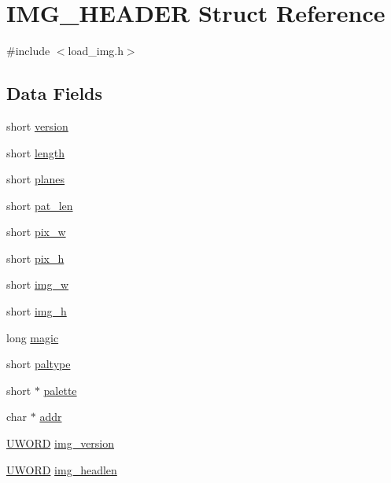 \hypertarget{structIMG__HEADER}{\section{I\+M\+G\+\_\+\+H\+E\+A\+D\+E\+R Struct Reference}
\label{structIMG__HEADER}
}


{\ttfamily \#include $<$load\+\_\+img.\+h$>$}

\subsection*{Data Fields}
\begin{DoxyCompactItemize}
\item 
short \hyperlink{structIMG__HEADER_a1b1d98bc34d00dcc045621d7d108aa33}{version}
\item 
short \hyperlink{structIMG__HEADER_a9b880fd83909bcba7f3e849b57a9a0c0}{length}
\item 
short \hyperlink{structIMG__HEADER_ad4657aaf83e1c3a89230a56177bdc7f4}{planes}
\item 
short \hyperlink{structIMG__HEADER_a93e811df0ab124abb41aca253725e620}{pat\+\_\+len}
\item 
short \hyperlink{structIMG__HEADER_a7f36b605eb7f7ff7f7157fba53a00e0b}{pix\+\_\+w}
\item 
short \hyperlink{structIMG__HEADER_a402dd152d2d3c8e41a69708a2d2eec7b}{pix\+\_\+h}
\item 
short \hyperlink{structIMG__HEADER_acab9fca679b5827910e3c2a6e302e9f2}{img\+\_\+w}
\item 
short \hyperlink{structIMG__HEADER_aeae05d69855fcda61b9d2e9f5e7aec32}{img\+\_\+h}
\item 
long \hyperlink{structIMG__HEADER_abbbc6e8856fd81c6feef3add32208f3f}{magic}
\item 
short \hyperlink{structIMG__HEADER_a7670a47b02ace635063baec09703a7ed}{paltype}
\item 
short $\ast$ \hyperlink{structIMG__HEADER_a62627863acc4854672b716af0f69a4b9}{palette}
\item 
char $\ast$ \hyperlink{structIMG__HEADER_a02e180ad82eed90e0aee536a3cfe62ac}{addr}
\item 
\hyperlink{bitmfile_8h_a0428171499a4ab7aebc2bf058ae337df}{U\+W\+O\+R\+D} \hyperlink{structIMG__HEADER_a419b9ebcef3ef87315256318886eb60c}{img\+\_\+version}
\item 
\hyperlink{bitmfile_8h_a0428171499a4ab7aebc2bf058ae337df}{U\+W\+O\+R\+D} \hyperlink{structIMG__HEADER_ab069cc485851b9af26104d9618f14468}{img\+\_\+headlen}

\end{DoxyCompactItemize}
